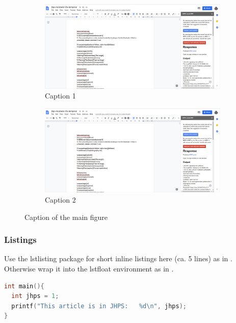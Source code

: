 \documentclass{jhps}
\begin{document}
\begin{figure}
  \begin{subfigure}[t]{3cm}
  \includegraphics[width=\textwidth]{jhps}
  \caption{Caption 1}\label{fig:1a}
  \end{subfigure}
  \quad
  \begin{subfigure}[t]{3cm}
  \includegraphics[width=\textwidth]{jhps}
  \caption{Caption 2}\label{fig:1b}
  \end{subfigure}
  \caption{Caption of the main figure}\label{fig:1}
\end{figure}


\subsubsection{Listings}

Use the lstlisting package for short inline listings here (ca.
5 lines) as in .
Otherwise wrap it into the lstfloat environment as in .

\begin{lstlisting}[caption="My listing",label=lst:listing,language=C,inputencoding={utf8},extendedchars=false]
int main(){
  int jhps = 1;
  printf("This article is in JHPS:   %d\n", jhps);
}
\end{lstlisting}
\end{document}
